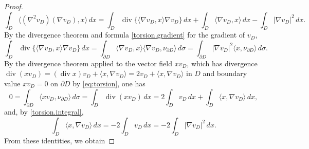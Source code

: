 \documentclass[10pt,a4paper]{amsart}
\renewcommand{\div}{\operatorname{div}} %
\newcommand{\grad}{\nabla}
\newcommand{\la}{\langle}
\newcommand{\pa}{\partial}
\newcommand{\ra}{\rangle}
\begin{document}
\begin{proof}
\[
\int_D \la (\nabla^2 v_D) (\nabla v_D), x\ra\,dx
= \int_D \div \{ \la \nabla v_D, x \ra \nabla v_D \} \, dx 
+ \int_D \la \nabla v_D, x \ra \, dx 
- \int_D |\nabla v_D|^2 \, dx.
\]
By the divergence theorem and formula \eqref{torsion.gradient} for the gradient of $v_D$,  
\[
\int_D \div \{ \la \nabla v_D, x \ra \nabla v_D \} \, dx 
= \int_{\pa D} \la \nabla v_D, x \ra \la \nabla v_D , \nu_{\pa D} \ra \, d\sigma
= \int_{\pa D} |\nabla v_D|^2 \la x,\nu_{\pa D}\ra \, d\sigma.
\]
By the divergence theorem applied to the vector field $x v_D$, 
which has divergence $\div(x v_D) = (\div x) v_D + \la x, \grad v_D \ra 
= 2 v_D + \la x, \grad v_D \ra$ in $D$ 
and boundary value $x v_D = 0$ on $\pa D$ by \eqref{eq:torsion},    
one has 
\[
0 = \int_{\pa D} \la x v_D , \nu_{\pa D} \ra \, d\sigma 
= \int_D \div(x v_D) \, dx 
= 2 \int_D v_D \, dx + \int_D \la x , \grad v_D \ra \, dx,
\]
and, by \eqref{torsion.integral},
\[
\int_D \la x , \grad v_D \ra \, dx 
= - 2 \int_D v_D \, dx 
= - 2 \int_D |\grad v_D|^2 \, dx.
\]
From these identities, we obtain  

\end{proof}
\end{document}
